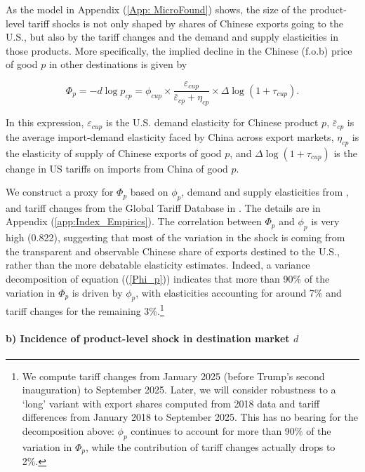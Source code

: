 \documentclass[english,12pt]{article}
\theoremstyle{definition}
\let\oldref\ref
\renewcommand{\ref}[1]{(\oldref{#1})}
\begin{document}
As the model in Appendix \ref{App: MicroFound} shows, the size of the 
product-level tariff shocks is not only shaped by shares of Chinese exports 
going to the U.S., but also by the tariff changes and the demand and supply 
elasticities in those products. More specifically, the implied decline
in the Chinese (f.o.b) price of good $p$ in other destinations is given by

\begin{equation}
\Phi_{p}=-d\log p_{cp}=\phi_{cup}\times\frac{\varepsilon_{cup}}{\bar{\varepsilon}_{cp}+\eta_{cp}}\times\Delta\log\left(1+\tau_{cup}\right).
\label{Phi_p}
\end{equation} 

In this expression, $\varepsilon_{cup}$ is the U.S. demand elasticity
for Chinese product $p$, $\bar{\varepsilon}_{cp}$ is the average 
import-demand elasticity faced by China across export markets, $\eta_{cp}$
is the elasticity of supply of Chinese exports of good $p$, and
$\Delta\log\left(1+\tau_{cup}\right)$ is the change in US tariffs
on imports from China of good $p$. 

We construct a proxy for $\Phi_{p}$ based on $\phi_{p}$, demand and supply
elasticities from \cite{soderbery2018trade}, and tariff changes from
the Global Tariff Database in \cite{rodriguez2025}
\citep[based on the methodology developed in][]{teti2024missing}. The details
are in Appendix \ref{app:Index_Empirics}. The 
correlation between $\Phi_{p}$ and $\phi_{p}$ is very high (0.822),
suggesting that most of the variation in the shock is coming from the 
transparent and observable Chinese share of exports destined to the U.S.,
rather than the more debatable elasticity estimates. Indeed, a variance
decomposition of equation (\ref{Phi_p}) indicates that more than
90\% of the variation in $\Phi_{p}$ is driven by $\phi_{p}$,
with elasticities accounting for around 7\% and tariff changes for the
remaining 3\%.\footnote{We compute tariff changes from January 2025 
(before Trump's second inauguration) to  September 2025. Later, we will 
consider robustness to a `long' variant with  export shares computed from 
2018 data and tariff differences from January 2018 to September 2025. This
has no bearing for the decomposition above: $\phi_{p}$ continues to account
for more than 90\% of the variation in $\Phi_{p}$, while the contribution
of tariff changes actually drops to 2\%.}

\paragraph{b) Incidence of product-level shock in destination market $d$}
\end{document}
